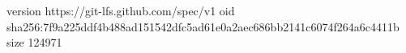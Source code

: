 version https://git-lfs.github.com/spec/v1
oid sha256:7f9a225ddf4b488ad151542dfc5ad61e0a2aec686bb2141c6074f264a6c4411b
size 124971
